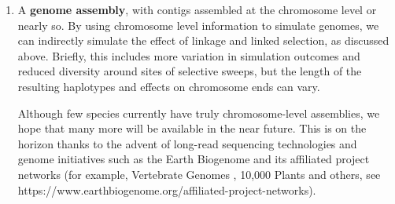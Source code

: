 \documentclass[hidelinks]{article}
\providecommand{\tightlist}{%
\setlength{\itemsep}{0pt}\setlength{\parskip}{0pt}}
\begin{document}
\begin{enumerate}
\def\labelenumi{\arabic{enumi}.}
\tightlist
\item
  A \textbf{genome assembly}, with contigs assembled at the chromosome
  level or nearly so. By using chromosome level information to simulate
  genomes, we can indirectly simulate the effect of linkage and linked
  selection, as discussed above. Briefly, this includes more variation
  in simulation outcomes and reduced diversity around sites of selective
  sweeps, but the length of the resulting haplotypes and effects on
  chromosome ends can vary.

Although few species currently have truly chromosome-level assemblies,
we hope that many more will be available in the near future.
This is on the horizon thanks to the advent of long-read sequencing technologies
\citep{Amarasinghe2020} and genome initiatives such as the Earth Biogenome
\citep{Lewin2022} and its affiliated project networks (for example,
Vertebrate Genomes \citep{Rhie2021}, 10,000 Plants \citep{Cheng2018} and others,
see https://www.earthbiogenome.org/affiliated-project-networks).


\end{enumerate}
\end{document}
